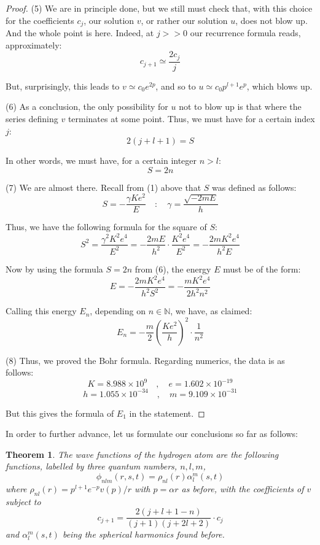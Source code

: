 \documentclass[12pt]{amsbook}
\newtheorem{theorem}{Theorem}[chapter]
\begin{document}
\begin{proof}
(5) We are in principle done, but we still must check that, with this choice for the coefficients $c_j$, our solution $v$, or rather our solution $u$, does not blow up. And the whole point is here. Indeed, at $j>>0$ our recurrence formula reads, approximately:
$$c_{j+1}\simeq\frac{2c_j}{j}$$

But, surprisingly, this leads to $v\simeq c_0e^{2p}$, and so to $u\simeq c_0p^{l+1}e^p$, which blows up.

\medskip

(6) As a conclusion, the only possibility for $u$ not to blow up is that where the series defining $v$ terminates at some point. Thus, we must have for a certain index $j$:
$$2(j+l+1)=S$$

In other words, we must have, for a certain integer $n>l$:
$$S=2n$$

(7) We are almost there. Recall from (1) above that $S$ was defined as follows:
$$S=-\frac{\gamma Ke^2}{E}\quad:\quad\gamma=\frac{\sqrt{-2mE}}{h}$$

Thus, we have the following formula for the square of $S$:
$$S^2=\frac{\gamma^2K^2e^4}{E^2}=-\frac{2mE}{h^2}\cdot\frac{K^2e^4}{E^2}=-\frac{2mK^2e^4}{h^2E}$$

Now by using the formula $S=2n$ from (6), the energy $E$ must be of the form:
$$E=-\frac{2mK^2e^4}{h^2S^2}=-\frac{mK^2e^4}{2h^2n^2}$$

Calling this energy $E_n$, depending on $n\in\mathbb N$, we have, as claimed:
$$E_n=-\frac{m}{2}\left(\frac{Ke^2}{h}\right)^2\cdot\frac{1}{n^2}$$

(8) Thus, we proved the Bohr formula. Regarding numerics, the data is as follows:
$$K=8.988\times10^9\quad,\quad
e=1.602\times10^{-19}$$
$$h=1.055\times10^{-34}\quad,\quad 
m=9.109\times10^{-31}$$

But this gives the formula of $E_1$ in the statement.
\end{proof}

In order to further advance, let us formulate our conclusions so far as follows:

\begin{theorem}
The wave functions of the hydrogen atom are the following functions, labelled by three quantum numbers, $n,l,m$,
$$\phi_{nlm}(r,s,t)=\rho_{nl}(r)\alpha_l^m(s,t)$$
where $\rho_{nl}(r)=p^{l+1}e^{-p}v(p)/r$ with $p=\alpha r$ as before, with the coefficients of $v$ subject to
$$c_{j+1}=\frac{2(j+l+1-n)}{(j+1)(j+2l+2)}\cdot c_j$$
and $\alpha_l^m(s,t)$ being the spherical harmonics found before.
\end{theorem}
\end{document}
